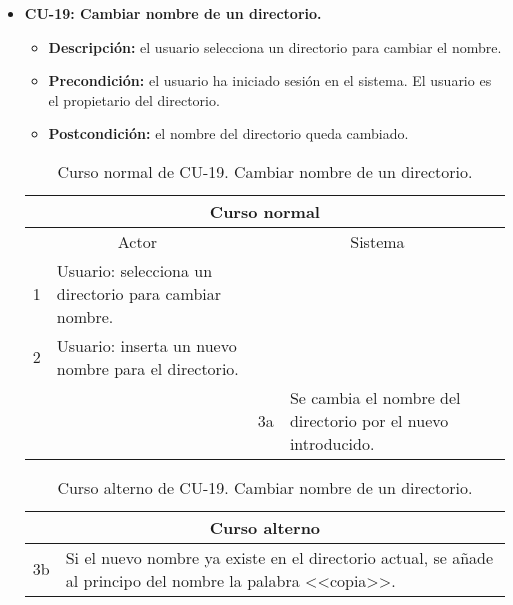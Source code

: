 \begin{itemize}
	\item \textbf{CU-19: Cambiar nombre de un directorio.}
	\begin{itemize}
		\item \textbf{Descripción:} el usuario selecciona un directorio para cambiar el nombre.
		\item \textbf{Precondición:} el usuario ha iniciado sesión en el sistema. El usuario es el propietario del directorio.
		\item \textbf{Postcondición:} el nombre del directorio queda cambiado.
	\end{itemize}
	\begin{table}[H]
		\centering
		\begin{tabular}{|p{0.3cm}|p{5cm}|p{0.3cm}|p{5cm}|}
			\hline
			\multicolumn{4}{|c|}{Curso normal} \\ \hline
			\multicolumn{2}{|c|}{Actor} & \multicolumn{2}{|c|}{Sistema} \\ \hline
			1 & Usuario: selecciona un directorio para cambiar nombre. &  &  \\ \hline
			2 & Usuario: inserta un nuevo nombre para el directorio. &  &  \\ \hline
			&  & 3a & Se cambia el nombre del directorio por el nuevo introducido. \\ \hline
		\end{tabular}
		\caption{Curso normal de CU-19. Cambiar nombre de un directorio.}
		\label{tabla:cu19-normal}
	\end{table}
	
	\begin{table}[H]
		\centering
		\begin{tabular}{|p{0.3cm}|p{10cm}|}
			\hline
			\multicolumn{2}{|c|}{Curso alterno} \\ \hline
			3b & Si el nuevo nombre ya existe en el directorio actual, se añade al principo del nombre la palabra <<copia>>. \\ \hline
		\end{tabular}
		\caption{Curso alterno de CU-19. Cambiar nombre de un directorio.}
		\label{tabla:cu19-alterno}
	\end{table}
\end{itemize}

